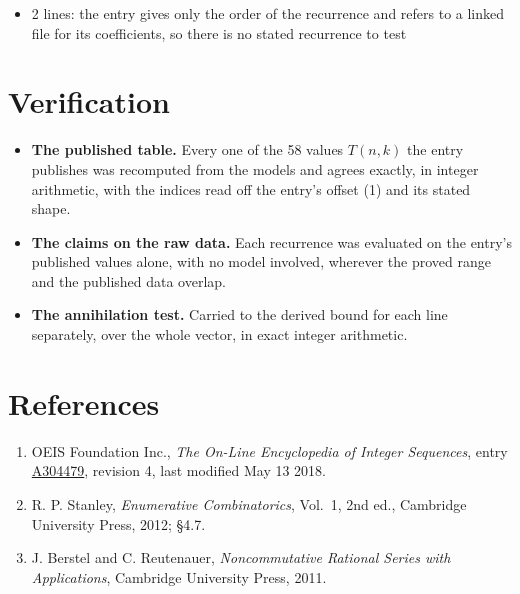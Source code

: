 \documentclass[11pt]{article}
\theoremstyle{definition}
\begin{document}
\begin{itemize}

\item 2 lines: the entry gives only the order of the recurrence and refers to a linked file for its coefficients, so there is no stated recurrence to test

\end{itemize}

\section{Verification}

\begin{itemize}

\item {\bfseries The published table.} Every one of the 58 values $T(n,k)$ the entry publishes was recomputed from the models and agrees exactly, in integer arithmetic, with the indices read off the entry's offset (1) and its stated shape.

\item {\bfseries The claims on the raw data.} Each recurrence was evaluated on the entry's published values alone, with no model involved, wherever the proved range and the published data overlap.

\item {\bfseries The annihilation test.} Carried to the derived bound for each line separately, over the whole vector, in exact integer arithmetic.

\end{itemize}

\section{References}

\begin{enumerate}

\item OEIS Foundation Inc., \emph{The On-Line Encyclopedia of Integer Sequences}, entry \href{https://oeis.org/A304479}{A304479}, revision 4, last modified May 13 2018.

\item R. P. Stanley, \emph{Enumerative Combinatorics}, Vol.~1, 2nd ed., Cambridge University Press, 2012; \S4.7.

\item J. Berstel and C. Reutenauer, \emph{Noncommutative Rational Series with Applications}, Cambridge University Press, 2011.

\end{enumerate}
\end{document}
